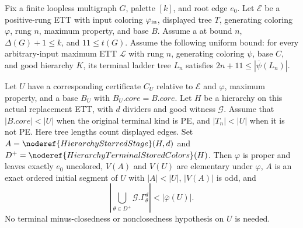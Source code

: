 \begin{lemma}
Fix a finite loopless multigraph $G$, palette $[k]$, and root edge $e_0$.
Let $\mathcal E$ be a positive-rung ETT with input coloring $\varphi_{\rm in}$,
displayed tree $T$, generating coloring $\varphi$, rung $n$, maximum property,
and base $B$. Assume a  at bound $n$,
$\Delta(G)+1\le k$, and $11\le t(G)$. Assume the following uniform bound:
for every arbitrary-input maximum ETT $\mathcal L$ with rung $n$, generating
coloring $\psi$, base $C$, and good hierarchy $K$, its terminal ladder tree
$L_n$ satisfies $2n+11\le |\overline\psi(L_n)|$.

Let $U$ have a corresponding certificate $C_U$ relative to $\mathcal E$
and $\varphi$, maximum property, and a base $B_U$ with
$B_U.\mathit{core}=B.\mathit{core}$. Let $H$ be a hierarchy on this actual
replacement ETT, with $d$ dividers and good witness $\mathcal G$.
Assume that $|B.\mathit{core}|<|U|$ when the original terminal kind is PE,
and $|T_n|<|U|$ when it is not PE. Here tree lengths count displayed edges.
Set $A=\noderef{HierarchyStarredStage}(H,d)$ and
$D^+=\noderef{HierarchyTerminalStoredColors}(H)$.
Then $\varphi$ is proper and leaves exactly $e_0$ uncolored,
$V(A)$ and $V(U)$ are elementary under $\varphi$,
$A$ is an exact ordered initial segment of $U$ with $|A|<|U|$,
$|V(A)|$ is odd, and
\[
 \left|\bigcup_{\theta\in D^+}\mathcal G.\Gamma^d_\theta\right|
       < |\overline\varphi(U)|.
\]
No terminal minus-closedness or nonclosedness hypothesis on $U$ is needed.
\end{lemma}
